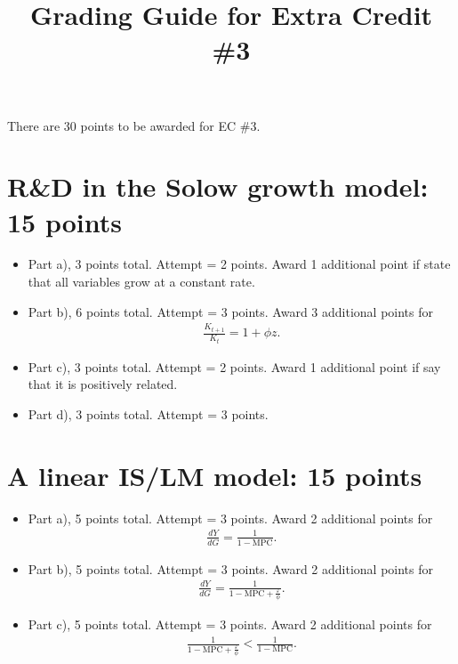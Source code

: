 \documentclass[12pt]{pracjourn_rwr}
\title{Grading Guide for Extra Credit \#3}
\theoremstyle{definition}
\theoremstyle{remark}
\begin{document}
\maketitle


There are 30 points to be awarded for EC \#3.

\section{R\&D in the Solow growth model: 15 points}
\begin{itemize}
\item Part a), 3 points total. Attempt = 2 points. Award 1 additional point if state that all variables grow at a constant rate.
\item Part b), 6 points total. Attempt = 3 points. Award 3 additional points for
\begin{align*}
\frac{K_{t+1}}{K_{t}} = 1 + \phi z.
\end{align*}
\item Part c), 3 points total. Attempt = 2 points. Award 1 additional point if say that it is positively related.
\item Part d), 3 points total. Attempt = 3 points.
\end{itemize}

\section{A linear IS/LM model: 15 points}

\begin{itemize}
\item Part a), 5 points total. Attempt = 3 points. Award 2 additional points for
\begin{align*}
\frac{dY}{dG} = \frac{1}{1-\text{MPC}}.
\end{align*}
\item Part b), 5 points total. Attempt = 3 points. Award 2 additional points for
\begin{align*}
\frac{dY}{dG} = \frac{1}{1-\text{MPC} + \frac{\varepsilon}{\phi}}.
\end{align*}
\item Part c), 5 points total. Attempt = 3 points.  Award 2 additional points for
\begin{align*}
\frac{1}{1-\text{MPC} + \frac{\varepsilon}{\phi}} < \frac{1}{1-\text{MPC}}.
\end{align*}
\end{itemize}

% 
% 
\end{document}
